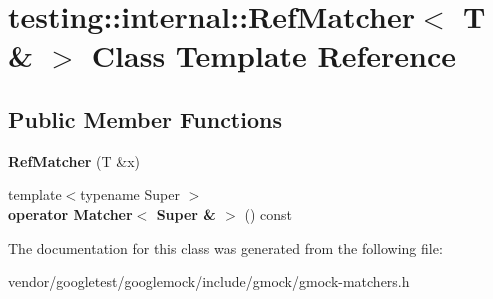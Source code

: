 \hypertarget{classtesting_1_1internal_1_1_ref_matcher_3_01_t_01_6_01_4}{}\section{testing\+:\+:internal\+:\+:Ref\+Matcher$<$ T \& $>$ Class Template Reference}
\label{classtesting_1_1internal_1_1_ref_matcher_3_01_t_01_6_01_4}
\subsection*{Public Member Functions}
\begin{DoxyCompactItemize}
\item 
\mbox{\label{classtesting_1_1internal_1_1_ref_matcher_3_01_t_01_6_01_4_a94eaec01f11b3ed704092a62cdb9c21c}} 
{\bfseries Ref\+Matcher} (T \&x)
\item 
\mbox{\label{classtesting_1_1internal_1_1_ref_matcher_3_01_t_01_6_01_4_ac146f2d10f0b2e361f903225be15d1a9}} 
{\footnotesize template$<$typename Super $>$ }\\{\bfseries operator Matcher$<$ Super \& $>$} () const
\end{DoxyCompactItemize}


The documentation for this class was generated from the following file\+:\begin{DoxyCompactItemize}
\item 
vendor/googletest/googlemock/include/gmock/gmock-\/matchers.\+h\end{DoxyCompactItemize}
